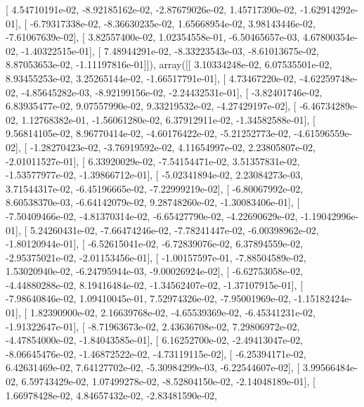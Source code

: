 \documentclass{article}
\begin{document}
       [  4.54710191e-02,  -8.92185162e-02,  -2.87679026e-02,
          1.45717390e-02,  -1.62914292e-01],
       [ -6.79317338e-02,  -8.36630235e-02,   1.65668954e-02,
          3.98143446e-02,  -7.61067639e-02],
       [  3.82557400e-02,   1.02354558e-01,  -6.50465657e-03,
          4.67800354e-02,  -1.40322515e-01],
       [  7.48944291e-02,  -8.33223543e-03,  -8.61013675e-02,
          8.87053653e-02,  -1.11197816e-01]]), array([[  3.10334248e-02,   6.07535501e-02,   8.93455253e-02,
          3.25265144e-02,  -1.66517791e-01],
       [  4.73467220e-02,  -4.62259748e-02,  -4.85645282e-03,
         -8.92199156e-02,  -2.24432531e-01],
       [ -3.82401746e-02,   6.83935477e-02,   9.07557990e-02,
          9.33219532e-02,  -4.27429197e-02],
       [ -6.46734289e-02,   1.12768382e-01,  -1.56061280e-02,
          6.37912911e-02,  -1.34582588e-01],
       [  9.56814105e-02,   8.96770414e-02,  -4.60176422e-02,
         -5.21252773e-02,  -4.61596559e-02],
       [ -1.28270423e-02,  -3.76919592e-02,   4.11654997e-02,
          2.23805807e-02,  -2.01011527e-01],
       [  6.33920029e-02,  -7.54154471e-02,   3.51357831e-02,
         -1.53577977e-02,  -1.39866712e-01],
       [ -5.02341894e-02,   2.23084273e-03,   3.71544317e-02,
         -6.45196665e-02,  -7.22999219e-02],
       [ -6.80067992e-02,   8.60538370e-03,  -6.64142079e-02,
          9.28748260e-02,  -1.30083406e-01],
       [ -7.50409466e-02,  -4.81370314e-02,  -6.65427790e-02,
         -4.22690629e-02,  -1.19042996e-01],
       [  5.24260431e-02,  -7.66474246e-02,  -7.78241447e-02,
         -6.00398962e-02,  -1.80120944e-01],
       [ -6.52615041e-02,  -6.72839076e-02,   6.37894559e-02,
         -2.95375021e-02,  -2.01153456e-01],
       [ -1.00157597e-01,  -7.88504589e-02,   1.53020940e-02,
         -6.24795944e-03,  -9.00026924e-02],
       [ -6.62753058e-02,  -4.44880288e-02,   8.19416484e-02,
         -1.34562407e-02,  -1.37107915e-01],
       [ -7.98640846e-02,   1.09410045e-01,   7.52974326e-02,
         -7.95001969e-02,  -1.15182424e-01],
       [  1.82390900e-02,   2.16639768e-02,  -4.65539369e-02,
         -6.45341231e-02,  -1.91322647e-01],
       [ -8.71963673e-02,   2.43636708e-02,   7.29806972e-02,
         -4.47854000e-02,  -1.84043585e-01],
       [  6.16252700e-02,  -2.49413047e-02,  -8.06645476e-02,
         -1.46872522e-02,  -4.73119115e-02],
       [ -6.25394171e-02,   6.42631469e-02,   7.64127702e-02,
         -5.30984299e-03,  -6.22544607e-02],
       [  3.99566484e-02,   6.59743429e-02,   1.07499278e-02,
         -8.52804150e-02,  -2.14048189e-01],
       [  1.66978428e-02,   4.84657432e-02,  -2.83481590e-02,
\end{document}
